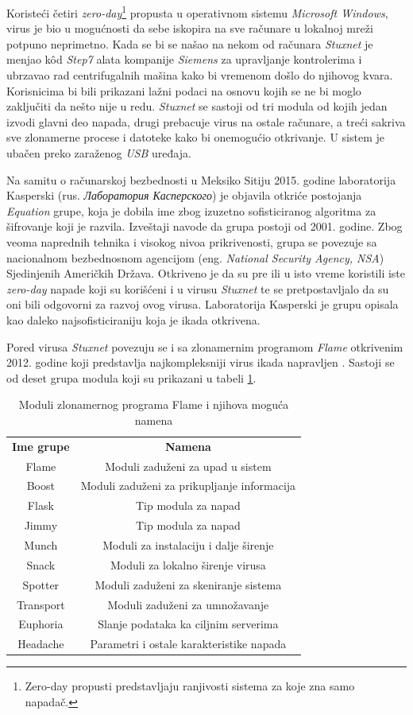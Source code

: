 \documentclass[a4paper]{article}
\begin{document}
Koristeći četiri \textit{zero-day}\footnote{Zero-day propusti predstavljaju ranjivosti sistema za koje zna samo napadač.} propusta u operativnom sistemu \textit{Microsoft Windows}, virus je bio u mogućnosti da sebe iskopira na sve računare u lokalnoj mreži potpuno neprimetno. Kada se bi se našao na nekom od računara \textit{Stuxnet} je menjao kôd \textit{Step7} alata kompanije \textit{Siemens} za upravljanje kontrolerima i ubrzavao rad centrifugalnih mašina kako bi vremenom došlo do njihovog kvara. Korisnicima bi bili prikazani lažni podaci na osnovu kojih se ne bi moglo zaključiti da nešto nije u redu. \textit{Stuxnet} se sastoji od tri modula od kojih jedan izvodi glavni deo napada, drugi prebacuje virus na ostale računare, a treći sakriva sve zlonamerne procese i datoteke kako bi onemogućio otkrivanje. U sistem je ubačen preko zaraženog \textit{USB} uređaja.

Na samitu o računarskoj bezbednosti u Meksiko Sitiju 2015. godine laboratorija Kasperski (rus. \textit{Лаборатория Касперского}) je objavila otkriće postojanja \textit{Equation} grupe, koja je dobila ime zbog izuzetno sofisticiranog algoritma za šifrovanje koji je razvila. Izveštaji navode da grupa postoji od 2001. godine. Zbog veoma naprednih tehnika i visokog nivoa prikrivenosti, grupa se povezuje sa nacionalnom bezbednosnom agencijom (eng. \textit{National Security Agency, NSA}) Sjedinjenih Američkih Država. Otkriveno je da su pre ili u isto vreme koristili iste \textit{zero-day} napade koji su korišćeni i u virusu \textit{Stuxnet} te se pretpostavljalo da su oni bili odgovorni za razvoj ovog virusa. Laboratorija Kasperski je grupu opisala kao daleko najsofisticiraniju koja je ikada otkrivena.

Pored virusa \textit{Stuxnet} povezuju se i sa zlonamernim programom \textit{Flame} otkrivenim 2012. godine koji predstavlja najkompleksniji virus ikada napravljen \cite{flame}. Sastoji se od deset grupa modula koji su prikazani u tabeli \ref{table:1}.

\begin{table}[h!]
\centering
\begin{tabular}{||c  c||} 
 \hline
 \textbf{Ime grupe} & \textbf{Namena} \\ 
 Flame & Moduli zaduženi za upad u sistem \\ 
 Boost & Moduli zaduženi za prikupljanje informacija \\
 Flask & Tip modula za napad \\
 Jimmy & Tip modula za napad \\
 Munch & Moduli za instalaciju i dalje širenje \\
 Snack & Moduli za lokalno širenje virusa \\
 Spotter & Moduli zaduženi za skeniranje sistema \\
 Transport & Moduli zaduženi za umnožavanje \\
 Euphoria & Slanje podataka ka ciljnim serverima \\
 Headache & Parametri i ostale karakteristike napada \\ [1ex] 
 \hline
\end{tabular}
\caption{Moduli zlonamernog programa Flame i njihova moguća namena}
\label{table:1}
\end{table}
\end{document}
